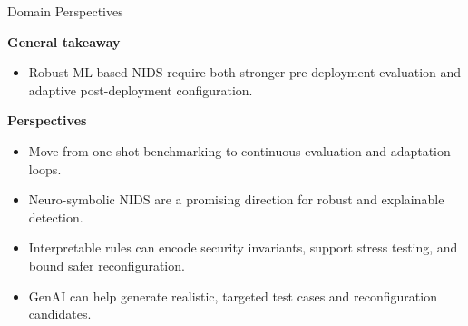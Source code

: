 \begin{frame}{Domain Perspectives}
	\small

	{\normalsize\textbf{General takeaway}}\\[-0.05em]
	\begin{itemize}
		\setlength\itemsep{0.35em}
		\item Robust ML-based NIDS require both stronger pre-deployment evaluation and adaptive post-deployment configuration.
	\end{itemize}

	\vspace{0.2em}
	{\normalsize\textbf{Perspectives}}\\[-0.05em]
	\begin{itemize}
		\setlength\itemsep{0.35em}
		\item Move from one-shot benchmarking to continuous evaluation and adaptation loops.
		\item Neuro-symbolic NIDS are a promising direction for robust and explainable detection.
		\item Interpretable rules can encode security invariants, support stress testing, and bound safer reconfiguration.
		\item GenAI can help generate realistic, targeted test cases and reconfiguration candidates.
	\end{itemize}
\end{frame}
